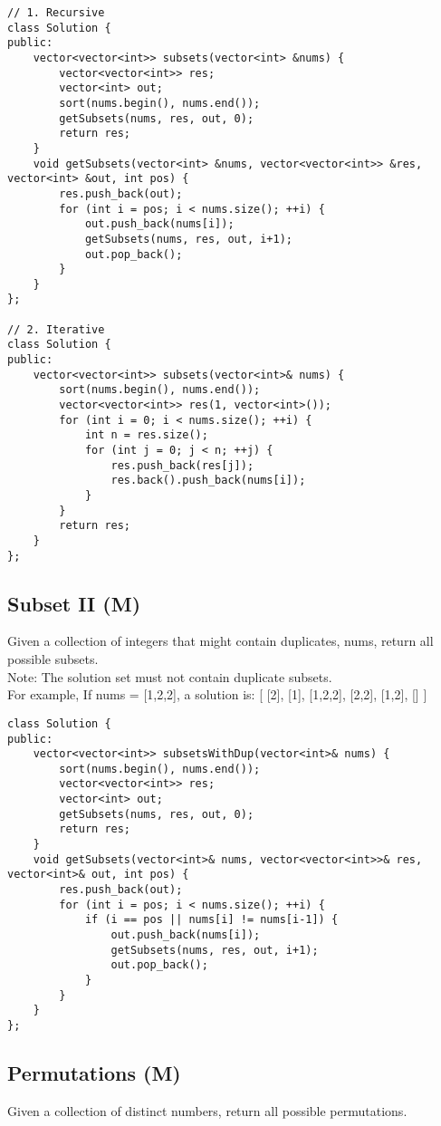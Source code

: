 \begin{lstlisting}
// 1. Recursive
class Solution {
public:
    vector<vector<int>> subsets(vector<int> &nums) {
        vector<vector<int>> res;
        vector<int> out;
        sort(nums.begin(), nums.end());
        getSubsets(nums, res, out, 0);
        return res;
    }
    void getSubsets(vector<int> &nums, vector<vector<int>> &res, vector<int> &out, int pos) {
        res.push_back(out);
        for (int i = pos; i < nums.size(); ++i) {
            out.push_back(nums[i]);
            getSubsets(nums, res, out, i+1);
            out.pop_back();
        }
    }
};

// 2. Iterative
class Solution {
public:
    vector<vector<int>> subsets(vector<int>& nums) {
        sort(nums.begin(), nums.end());
        vector<vector<int>> res(1, vector<int>());
        for (int i = 0; i < nums.size(); ++i) {
            int n = res.size();
            for (int j = 0; j < n; ++j) {
                res.push_back(res[j]);
                res.back().push_back(nums[i]);
            }
        }
        return res;
    }
};
\end{lstlisting}


\subsection{Subset II (M)}
Given a collection of integers that might contain duplicates, nums, return all possible subsets.\\
Note: The solution set must not contain duplicate subsets.\\
For example,
If nums = [1,2,2], a solution is:
[
  [2],
  [1],
  [1,2,2],
  [2,2],
  [1,2],
  []
]\\

\begin{lstlisting}
class Solution {
public:
    vector<vector<int>> subsetsWithDup(vector<int>& nums) {
        sort(nums.begin(), nums.end());
        vector<vector<int>> res;
        vector<int> out;
        getSubsets(nums, res, out, 0);
        return res;
    }
    void getSubsets(vector<int>& nums, vector<vector<int>>& res, vector<int>& out, int pos) {
        res.push_back(out);
        for (int i = pos; i < nums.size(); ++i) {
            if (i == pos || nums[i] != nums[i-1]) {
                out.push_back(nums[i]);
                getSubsets(nums, res, out, i+1);
                out.pop_back();
            }
        }
    }
};
\end{lstlisting}


\subsection{Permutations (M)}
Given a collection of distinct numbers, return all possible permutations. \\

